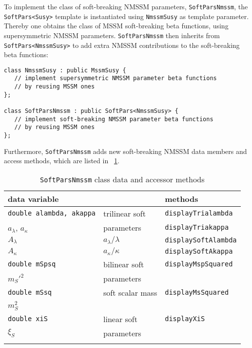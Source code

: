 \documentclass[final,3p,times,pdflatex]{elsarticle}
\def\code#1{\small{\tt #1}\normalsize}
\begin{document}
To implement the class of soft-breaking NMSSM parameters,
\code{SoftParsNmssm}, the \code{SoftPars<Susy>} template is
instantiated using \code{NmssmSusy} as template parameter.  Thereby
one obtains the class of MSSM soft-breaking beta functions, using
supersymmetric NMSSM parameters.  \code{SoftParsNmssm} then inherits
from \code{SoftPars<NmssmSusy>} to add extra NMSSM contributions to
the soft-breaking beta functions:
%
\begin{verbatim}
class NmssmSusy : public MssmSusy {
   // implement supersymmetric NMSSM parameter beta functions
   // by reusing MSSM ones
};

class SoftParsNmssm : public SoftPars<NmssmSusy> {
   // implement soft-breaking NMSSM parameter beta functions
   // by reusing MSSM ones
};
\end{verbatim}
%
Furthermore, \code{SoftParsNmssm} adds new soft-breaking NMSSM data
members and access methods, which are listed in
\tablename~\ref{tab:nmssmsoftpars}.
%
\begin{table}
  \centering
  \begin{tabular}{lll}
    data variable & & methods \\\hline
    \code{\small double alambda, akappa} & trilinear soft &
    \code{\small displayTrialambda}
    \\
    $a_\lambda$, $a_\kappa$ & parameters & \code{\small displayTriakappa}
    \\\hline
    $A_\lambda$ & $a_\lambda / \lambda$ & \code{\small displaySoftAlambda}
    \\
    $A_\kappa$ & $a_\kappa / \kappa$ & \code{\small displaySoftAkappa}
    \\\hline
    \code{\small double mSpsq} & bilinear soft &
    \code{\small displayMspSquared}
    \\
    $m_{S}'^2$ & parameters &
    \\\hline
    \code{\small double mSsq} & soft scalar mass &
    \code{\small displayMsSquared}
    \\
    $m_S^2$ & &
    \\\hline
    \code{\small double xiS} & linear soft &
    \code{\small displayXiS}
    \\
    $\xi_S$ & parameters &
    \\\hline
    \normalsize
  \end{tabular}
  \caption{\code{SoftParsNmssm} class data and accessor methods
    \label{tab:nmssmsoftpars}}
\end{table}
\end{document}
